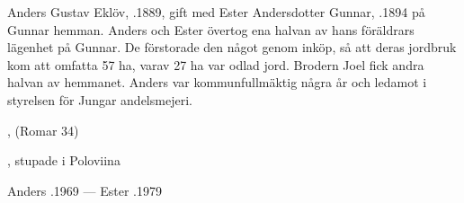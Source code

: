 %
Anders Gustav Eklöv, .1889, gift med Ester Andersdotter Gunnar, .1894 på Gunnar hemman. Anders och Ester övertog ena halvan av hans föräldrars lägenhet på Gunnar. De förstorade den något genom inköp, så att deras jordbruk kom att omfatta 57 ha, varav 27 ha var odlad jord. Brodern Joel fick andra halvan av hemmanet. Anders var kommunfullmäktig några år och ledamot i styrelsen för Jungar andelsmejeri.
\begin{jhchildren}
  \item {}
  \item {}, (Romar 34)
  \item {}
  \item {}
  \item {}, stupade i Poloviina
  \item {}
  \item {}
  \item {}
  \item {}
  \item {}
  \item {}
  \item {}
\end{jhchildren}

Anders .1969  ---  Ester .1979


